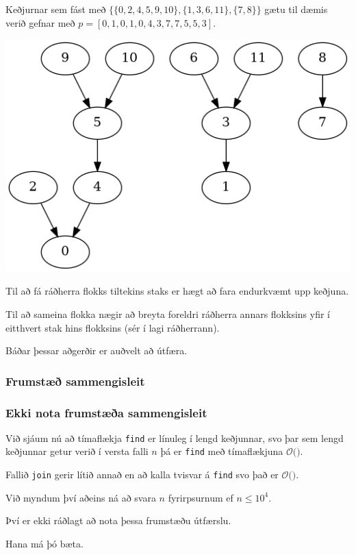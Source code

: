 {
	{
		\item<1-> Keðjurnar sem fást með $\{\{0, 2, 4, 5, 9, 10\}, \{1, 3, 6, 11\}, \{7, 8\}\}$ gætu til dæmis verið gefnar með
					$p = [0, 1, 0, 1, 0, 4, 3, 7, 7, 5, 5, 3]$.
		\item<2->[] \includegraphics[scale=0.5]{fig/mynd.png}
	}
}

{
	{
		\item<1-> Til að fá ráðherra flokks tiltekins staks er hægt að fara endurkvæmt upp keðjuna.
		\item<2-> Til að sameina flokka nægir að breyta foreldri ráðherra annars flokksins yfir í
			eitthvert stak hins flokksins (sér í lagi ráðherrann).
		\item<3-> Báðar þessar aðgerðir er auðvelt að útfæra.
	}
}

{
	\frametitle{Frumstæð sammengisleit}
}

{
	\frametitle{Ekki nota frumstæða sammengisleit}
	{
		\item<1-> Við sjáum nú að tímaflækja \texttt{find} er línuleg í lengd keðjunnar, svo 
			þar sem lengd keðjunnar getur verið í versta falli $n$ þá er \texttt{find} með tímaflækjuna $\mathcal{O}($\onslide<2->{$\,n\,$}$)$.
		\item<3-> Fallið \texttt{join} gerir lítið annað en að kalla tvisvar á \texttt{find} svo það er $\mathcal{O}($\onslide<4->{$\,n\,$}$)$.
		\item<5-> Við myndum því aðeins ná að svara $n$ fyrirpsurnum ef $n \leq 10^4$.
		\item<6-> Því er ekki ráðlagt að nota þessa frumstæðu útfærslu.
		\item<7-> Hana má þó bæta.
	}
}

